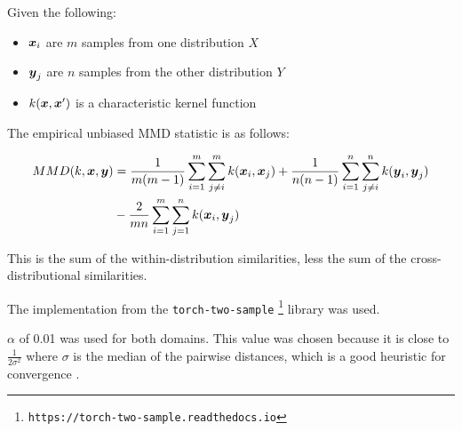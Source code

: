 Given the following:

\begin{itemize}
    \item $\boldsymbol{x}_i$ are $m$ samples from one distribution  $X$
    \item $\boldsymbol{y}_j$ are $n$ samples from the other distribution $Y$
    \item $k(\boldsymbol{x}, \boldsymbol{x}')$ is a characteristic kernel function
\end{itemize}

The empirical unbiased MMD statistic is as follows:

\begin{equation*}
\label{eq:mmd}
\begin{split}
MMD (k, \boldsymbol{x}, \boldsymbol{y}) &= \frac{1}{m(m-1)} \sum_{i=1}^m \sum_{j \neq i}^m k(\boldsymbol{x}_i, \boldsymbol{x}_j) + \frac{1}{n(n-1)} \sum_{i=1}^n \sum_{j \neq i}^n k(\boldsymbol{y}_i, \boldsymbol{y}_j) \\
&- \frac{2}{mn} \sum_{i=1}^m \sum_{j=1}^n k(\boldsymbol{x}_i, \boldsymbol{y}_j)
\end{split}
\end{equation*}

This is the sum of the within-distribution similarities, less the sum of the cross-distributional similarities. 


The implementation from the \texttt{torch-two-sample} \footnote{\texttt{https://torch-two-sample.readthedocs.io}} library \cite{torchtwosample} was used.

$\alpha$ of 0.01 was used for both domains. This value was chosen because it is close to $\frac{1}{2 \sigma^2}$ where $\sigma$ is the median of the pairwise distances, which is a good heuristic for convergence \cite{Garreau2017LargeSA} .  

